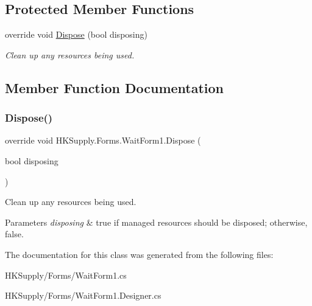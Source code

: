 \subsection*{Protected Member Functions}
\begin{DoxyCompactItemize}
\item 
override void \mbox{\hyperlink{class_h_k_supply_1_1_forms_1_1_wait_form1_a027bddb5e3b1ce651dea8c558f5a0732}{Dispose}} (bool disposing)
\begin{DoxyCompactList}\small\item\em Clean up any resources being used. \end{DoxyCompactList}\end{DoxyCompactItemize}


\subsection{Member Function Documentation}
\mbox{\label{class_h_k_supply_1_1_forms_1_1_wait_form1_a027bddb5e3b1ce651dea8c558f5a0732}} 
\subsubsection{\texorpdfstring{Dispose()}{Dispose()}}
{\footnotesize\ttfamily override void H\+K\+Supply.\+Forms.\+Wait\+Form1.\+Dispose (\begin{DoxyParamCaption}\item[{bool}]{disposing }\end{DoxyParamCaption})\hspace{0.3cm}{\ttfamily [protected]}}



Clean up any resources being used. 


\begin{DoxyParams}{Parameters}
{\em disposing} & true if managed resources should be disposed; otherwise, false.\\
\hline
\end{DoxyParams}


The documentation for this class was generated from the following files\+:\begin{DoxyCompactItemize}
\item 
H\+K\+Supply/\+Forms/Wait\+Form1.\+cs\item 
H\+K\+Supply/\+Forms/Wait\+Form1.\+Designer.\+cs\end{DoxyCompactItemize}
